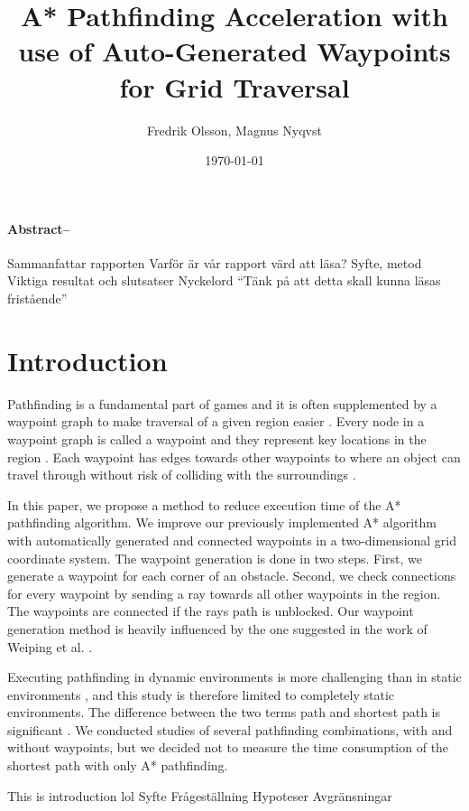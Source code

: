 \documentclass[a4paper]{article}
\title{\Huge A* Pathfinding Acceleration with use of Auto-Generated Waypoints for Grid Traversal}
\author{Fredrik Olsson, Magnus Nyqvst}
\date{\today}
\begin{document}
\maketitle
\newpage
\thispagestyle{empty}
\paragraph{Abstract--}
Sammanfattar rapporten
Varför är vår rapport värd att läsa?
Syfte, metod
Viktiga resultat och slutsatser Nyckelord
“Tänk på att detta skall kunna läsas fristående”

\tableofcontents
\listoffigures
\newpage
{}
\twocolumn
\section{Introduction}
Pathfinding is a fundamental part of games \cite{dynaPF15}\cite{roboGame15} and it is often supplemented by a waypoint graph to make traversal of a given region easier \cite{dynaPF15}. Every node in a waypoint graph is called a waypoint and they represent key locations in the region \cite{dynaPF15}. Each waypoint has edges towards other waypoints to where an object can travel through without risk of colliding with the surroundings \cite{dynaPF15}.
	
In this paper, we propose a method to reduce execution time of the A* pathfinding algorithm. We improve our previously implemented A* algorithm with automatically generated and connected waypoints in a two-dimensional grid coordinate system. The waypoint generation is done in two steps. First, we generate a waypoint for each corner of an obstacle. Second, we check connections for every waypoint by sending a ray towards all other waypoints in the region. The waypoints are connected if the rays path is unblocked. Our waypoint generation method is heavily influenced by the one suggested in the work of Weiping et al. \cite{dynaPF15}.
	
Executing pathfinding in dynamic environments is more challenging than in static environments \cite{dynaPF15}, and this study is therefore limited to completely static environments. The difference between the two terms path and shortest path is significant \cite{heuristicGame15}. We conducted studies of several pathfinding combinations, with and without waypoints, but we decided not to measure the time consumption of the shortest path with only A* pathfinding.
	
This is introduction lol \newline
Syfte \newline
Frågeställning \newline
Hypoteser \newline
Avgränsningar
\end{document}
